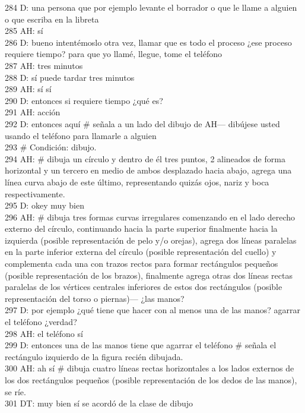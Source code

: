 284 D: una persona que por ejemplo levante el borrador o que le llame a alguien o que escriba en la libreta\\
285 AH: sí\\
286 D: bueno intentémoslo otra vez, llamar que es todo el proceso ¿ese proceso requiere tiempo? para que yo llamé, llegue, tome el teléfono\\
287 AH: tres minutos\\
288 D: sí puede tardar tres minutos\\
289 AH: sí sí\\
290 D: entonces si requiere tiempo ¿qué es?\\
291 AH: acción\\
292 D: entonces aquí \# señala a un lado del dibujo de AH--- dibújese usted usando el teléfono para llamarle a alguien\\
293 \# Condición: dibujo.\\
294 AH: \# dibuja un círculo y dentro de él tres puntos, 2 alineados de forma horizontal y un tercero en medio de ambos desplazado hacia abajo, agrega una línea curva abajo de este último, representando quizás ojos, nariz y boca respectivamente.\\
295 D: okey muy bien\\
296 AH: \# dibuja tres formas curvas irregulares comenzando en el lado derecho externo del círculo, continuando hacia la parte superior  finalmente hacia la izquierda (posible representación de pelo y/o orejas), agrega dos líneas paralelas en la parte inferior externa del círculo (posible representación del cuello) y complementa cada una con trazos rectos para formar rectángulos pequeños (posible representación de los brazos), finalmente agrega otras dos líneas rectas paralelas de los vértices centrales inferiores de estos dos rectángulos (posible representación del torso o piernas)--- ¿las manos?\\
297 D: por ejemplo ¿qué tiene que hacer con al menos una de las manos? agarrar el teléfono ¿verdad?\\
298 AH: el teléfono sí\\
299 D: entonces una de las manos tiene que agarrar el teléfono \# señala el rectángulo izquierdo de la figura recién dibujada.\\
300 AH: ah sí \# dibuja cuatro líneas rectas horizontales a los lados externos de los dos rectángulos pequeños (posible representación de los dedos de las manos), se ríe.\\
301 DT: muy bien sí se acordó de la clase de dibujo\\
